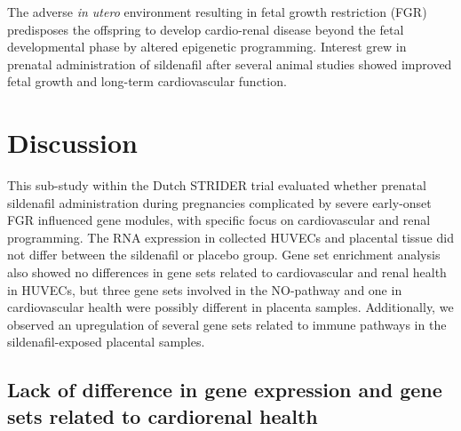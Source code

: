 \documentclass[authordate, empirical]{jote-new-article}
\begin{document}
    The adverse \emph{in utero }environment resulting in fetal growth restriction (FGR) predisposes the offspring to develop cardio-renal disease beyond the fetal developmental phase by altered epigenetic programming. Interest grew in prenatal administration of sildenafil after several animal studies showed improved fetal growth and long-term cardiovascular function.



	\section{Discussion}







	This sub-study within the Dutch STRIDER trial evaluated whether prenatal sildenafil administration during pregnancies complicated by severe early-onset FGR influenced gene modules, with specific focus on cardiovascular and renal programming. The RNA expression in collected HUVECs and placental tissue did not differ between the sildenafil or placebo group. Gene set enrichment analysis also showed no differences in gene sets related to cardiovascular and renal health in HUVECs, but three gene sets involved in the NO-pathway and one in cardiovascular health were possibly different in placenta samples. Additionally, we observed an upregulation of several gene sets related to immune pathways in the sildenafil-exposed placental samples.







	\subsection{Lack of difference in gene expression and gene sets related to cardiorenal health}
\end{document}
